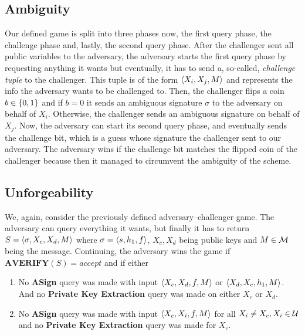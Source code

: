  \subsection{Ambiguity}
    Our defined game is split into three phases now, the first query phase, the challenge phase and, lastly, the second query phase. 
    After the challenger sent all public variables to the adversary, the adversary starts the first query phase by requesting anything it wants but eventually, it has to send a, so-called, \textit{challenge tuple} to the challenger.
    This tuple is of the form \(\langle X_i, X_j, M \rangle\) and represents the info the adversary wants to be challenged to.
    Then, the challenger flips a coin \(b\in \{ 0,1 \}\) and if \(b = 0\) it sends an ambiguous signature \(\sigma\) to the adversary on behalf of \(X_i\).
    Otherwise, the challenger sends an ambiguous signature on behalf of \(X_j\). Now, the adversary can start its second query phase, and eventually sends the challenge bit, which is a guess whose signature the challenger sent to our adversary.
    The adversary wins if the challenge bit matches the flipped coin of the challenger because then it managed to circumvent the ambiguity of the scheme.
  
    \subsection{Unforgeability}\label{unforgeability}
      We, again, consider the previously defined adversary--challenger game.
      The adversary can query everything it wants, but finally it has to return \(S=\langle \sigma, X_c, X_d, M \rangle\) where \(\sigma=\langle s, h_1, f \rangle\), \(X_c, X_d\) being public keys and \(M\in\mathcal{M}\) being the message.
      Continuing, the adversary wins the game if \(\textbf{AVERIFY}(S) = accept\) and if either
        \begin{enumerate}
          \item No \textbf{ASign} query was made with input \(\langle X_c, X_d, f, M \rangle\) or \(\langle X_d, X_c, h_1, M \rangle\).
                And no \textbf{Private Key Extraction} query was made on either \(X_c\) or \(X_d\).
          \item No \textbf{ASign} query was made with input \(\langle X_c, X_i, f, M \rangle\) for all \(X_i \neq X_c, X_i\in\mathcal{U}\) and no \textbf{Private Key Extraction} query was made for \(X_c\).
        \end{enumerate}